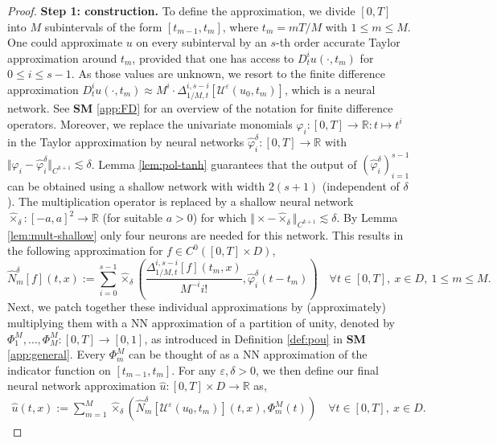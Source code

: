 \documentclass{article}
\numberwithin{equation}{section}
\newcommand{\R}{\mathbb{R}}
\newcommand{\cU}{\mathcal{U}}
\newcommand{\uhat}{{\widehat{u}}}
\renewcommand{\epsilon}{\varepsilon}
\newcommand{\1}{\mathbbm{1}}
\newcommand{\hattimes}{\widehat{\times}}
\newcommand{\hatN}{\widehat{N}}
\begin{document}
\begin{proof}
\textbf{Step 1: construction. }
To define the approximation, we divide $[0,T]$ into $M$ subintervals of the form $[t_{m-1},t_m]$, where $t_m = mT/M$ with $1\leq m\leq M$. One could approximate $u$ on every subinterval by an $s$-th order accurate Taylor approximation around $t_m$, provided that one has access to $D^i_t u(\cdot, t_m)$ for $0\leq i \leq s-1$. As those values are unknown, we resort to the finite difference approximation $D^i_t u(\cdot, t_m)\approx M^i\cdot \Delta^{i,s-i}_{1/M,t}[\cU^\epsilon(u_0,t_m)]$, which is a neural network. See \textbf{SM} \ref{app:FD} for an overview of the notation for finite difference operators. Moreover, we replace the univariate monomials $\varphi_i:[0,T]\to\R: t\mapsto t^i$ in the Taylor approximation by neural networks $\widehat{\varphi}_i^\delta:[0,T]\to\R$ with $\Vert\varphi_i-\widehat{\varphi}_i^\delta\Vert_{C^{k+1}}\lesssim \delta$. Lemma \ref{lem:pol-tanh} guarantees that the output of $(\widehat{\varphi}_i^\delta)_{i=1}^{s-1}$ can be obtained using a shallow network with width $2(s+1)$ (independent of $\delta$). The multiplication operator is replaced by a shallow neural network $\hattimes_\delta: [-a,a]^2\to\R$ (for suitable $a>0$) for which $\Vert\times-\hattimes_\delta\Vert_{C^{k+1}}\lesssim \delta$. By Lemma \ref{lem:mult-shallow} only four neurons are needed for this network. This results in the following approximation for $f\in C^0([0,T]\times D)$, 
\begin{equation}
     \hatN^{\delta}_m[f](t,x) := \sum_{i=0}^{s-1} \hattimes_\delta\left(\frac{\Delta^{i,s-i}_{1/M,t}[f](t_m,x)}{M^{-i} i!}, \widehat{\varphi}_i^\delta(t-t_m)\right) \quad \forall t\in [0,T], \: x\in D, \: 1\leq m\leq M. 
\end{equation}
Next, we patch together these individual approximations by (approximately) multiplying them with a NN approximation of a partition of unity, denoted by $\Phi^M_1, \ldots, \Phi^M_M:[0,T]\to[0,1]$, as introduced in Definition \ref{def:pou} in \textbf{SM} \ref{app:general}. Every $\Phi_m^M$ can be thought of as a NN approximation of the indicator function on $[t_{m-1},t_m]$. For any $\epsilon,\delta>0$, we then define our final neural network approximation $\uhat:[0,T]\times D\to \R$ as,
\begin{equation}\label{eq:def-pinn}
\begin{split}
     \uhat(t,x) := \sum_{m=1}^M \hattimes_\delta \left(\hatN^{\delta}_m[\cU^\epsilon(u_0,t_m)](t,x), \Phi^M_m(t)\right) \quad \forall t\in [0,T], \: x\in D.
\end{split}
\end{equation}


\end{proof}
\end{document}

